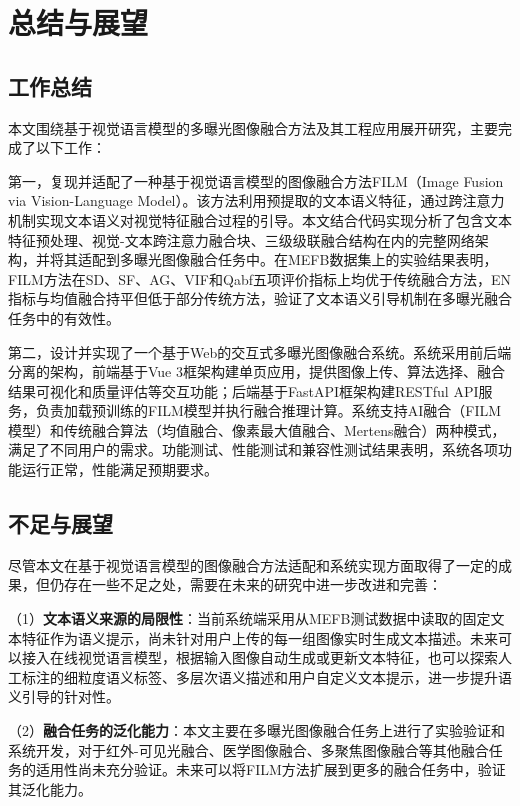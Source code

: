 \section{总结与展望}\label{ch:conclusion}

\subsection{工作总结}\label{sec:summary}

本文围绕基于视觉语言模型的多曝光图像融合方法及其工程应用展开研究，主要完成了以下工作：

第一，复现并适配了一种基于视觉语言模型的图像融合方法FILM（Image Fusion via Vision-Language Model）。该方法利用预提取的文本语义特征，通过跨注意力机制实现文本语义对视觉特征融合过程的引导。本文结合代码实现分析了包含文本特征预处理、视觉-文本跨注意力融合块、三级级联融合结构在内的完整网络架构，并将其适配到多曝光图像融合任务中。在MEFB数据集上的实验结果表明，FILM方法在SD、SF、AG、VIF和Qabf五项评价指标上均优于传统融合方法，EN指标与均值融合持平但低于部分传统方法，验证了文本语义引导机制在多曝光融合任务中的有效性。

第二，设计并实现了一个基于Web的交互式多曝光图像融合系统。系统采用前后端分离的架构，前端基于Vue 3框架构建单页应用，提供图像上传、算法选择、融合结果可视化和质量评估等交互功能；后端基于FastAPI框架构建RESTful API服务，负责加载预训练的FILM模型并执行融合推理计算。系统支持AI融合（FILM模型）和传统融合算法（均值融合、像素最大值融合、Mertens融合）两种模式，满足了不同用户的需求。功能测试、性能测试和兼容性测试结果表明，系统各项功能运行正常，性能满足预期要求。

\subsection{不足与展望}\label{sec:future}

尽管本文在基于视觉语言模型的图像融合方法适配和系统实现方面取得了一定的成果，但仍存在一些不足之处，需要在未来的研究中进一步改进和完善：

（1）\textbf{文本语义来源的局限性}：当前系统端采用从MEFB测试数据中读取的固定文本特征作为语义提示，尚未针对用户上传的每一组图像实时生成文本描述。未来可以接入在线视觉语言模型，根据输入图像自动生成或更新文本特征，也可以探索人工标注的细粒度语义标签、多层次语义描述和用户自定义文本提示，进一步提升语义引导的针对性。

（2）\textbf{融合任务的泛化能力}：本文主要在多曝光图像融合任务上进行了实验验证和系统开发，对于红外-可见光融合、医学图像融合、多聚焦图像融合等其他融合任务的适用性尚未充分验证。未来可以将FILM方法扩展到更多的融合任务中，验证其泛化能力。

